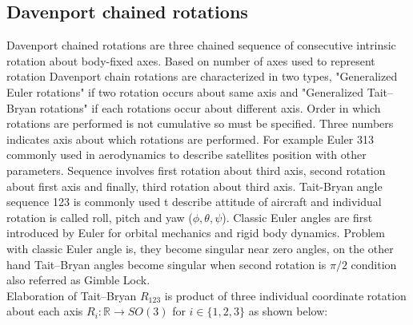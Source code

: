 \subsection{Davenport chained rotations}
Davenport chained rotations are three chained sequence of consecutive intrinsic rotation about body-fixed axes. Based on number of axes used to represent rotation Davenport chain rotations are characterized in two types, "Generalized Euler rotations" if two rotation occurs about same axis and "Generalized Tait–Bryan rotations" if each rotations occur about different axis. Order in which rotations are performed is not cumulative so must be specified. Three numbers indicates axis about which rotations are performed. For example Euler 313 commonly used in aerodynamics to describe satellites position with other parameters. Sequence involves first rotation about third axis, second rotation about first axis and finally, third rotation about third axis. Tait-Bryan angle sequence 123 is commonly used t describe attitude of aircraft and individual rotation is called roll, pitch and yaw ($ \phi ,\theta ,\psi $). Classic Euler angles are first introduced by Euler for orbital mechanics and rigid body dynamics. Problem with classic Euler angle is, they become singular near zero angles, on the other hand Tait–Bryan angles become singular when second rotation is $ \pi/2$ condition also referred as Gimble Lock. \\

\noindent Elaboration of Tait–Bryan $ R_{123}$ is product of three individual coordinate rotation about each axis $R_{i} :\mathbb{R}\longrightarrow SO( 3)$ for $ i\in \{1,2,3\}$ as shown below:


